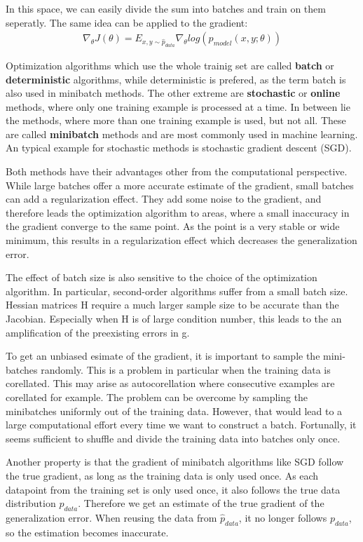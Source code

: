 In this space, we can easily divide the sum into batches and train on them
seperatly. The same idea can be applied to the gradient:
\begin{align}
    \nabla_\theta J(\theta)=E_{x,y\sim \hat{p}_{data}} \nabla_\theta log(p_{model}(x,y;\theta))
\end{align}

Optimization algorithms which use the whole trainig set are called
\textbf{batch} or \textbf{deterministic} algorithms, while deterministic is
prefered, as the term batch is also used in minibatch methods. The other extreme
are \textbf{stochastic} or \textbf{online} methods, where only one training
example is processed at a time. In between lie the methods, where more than one
training example is used, but not all. These are called \textbf{minibatch}
methods and are most commonly used in machine learning. An typical example for
stochastic methods is stochastic gradient descent (SGD).


Both methods have their advantages other from the computational perspective.
While large batches offer a more accurate estimate of the gradient, small
batches can add a regularization effect. They add some noise to the gradient,
and therefore leads the optimization algorithm to areas, where a small
inaccuracy in the gradient converge to the same point. As the point is a very
stable or wide minimum, this results in a regularization effect which decreases
the generalization error.


The effect of batch size is also sensitive to the choice of the optimization
algorithm. In particular, second-order algorithms suffer from a small batch
size. Hessian matrices H require a much larger sample size to be accurate than
the Jacobian. Especially when H is of large condition number, this leads to the
an amplification of the preexisting errors in g.

To get an unbiased esimate of the gradient, it is important to sample the
mini-batches randomly. This is a problem in particular when the training data is
corellated. This may arise as autocorellation where consecutive examples are
corellated for example. The problem can be overcome by sampling the minibatches
uniformly out of the training data. However, that would lead to a large
computational effort every time we want to construct a batch. Fortunally, it
seems sufficient to shuffle and divide the training data into batches only once.

Another property is that the gradient of minibatch algorithms like SGD follow
the true gradient, as long as the training data is only used once. As each
datapoint from the training set is only used once, it also follows the true data
distribution $p_{data}$. Therefore we get an estimate of the true gradient of
the generalization error. When reusing the data from $\hat{p}_{data}$, it no
longer follows $p_{data}$, so the estimation becomes inaccurate.

